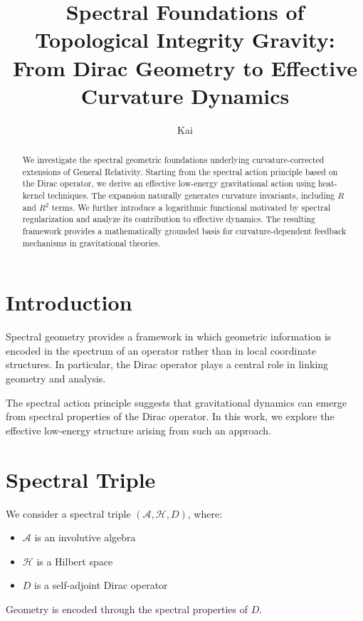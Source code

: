 \documentclass[11pt]{article}
\title{Spectral Foundations of Topological Integrity Gravity:\\
From Dirac Geometry to Effective Curvature Dynamics}
\author{Kai}
\date{}
\begin{document}
\maketitle

\begin{abstract}
We investigate the spectral geometric foundations underlying curvature-corrected extensions of General Relativity. Starting from the spectral action principle based on the Dirac operator, we derive an effective low-energy gravitational action using heat-kernel techniques. The expansion naturally generates curvature invariants, including $R$ and $R^2$ terms. We further introduce a logarithmic functional motivated by spectral regularization and analyze its contribution to effective dynamics. The resulting framework provides a mathematically grounded basis for curvature-dependent feedback mechanisms in gravitational theories.
\end{abstract}

\section{Introduction}

Spectral geometry provides a framework in which geometric information is encoded in the spectrum of an operator rather than in local coordinate structures. In particular, the Dirac operator plays a central role in linking geometry and analysis.

The spectral action principle suggests that gravitational dynamics can emerge from spectral properties of the Dirac operator. In this work, we explore the effective low-energy structure arising from such an approach.

\section{Spectral Triple}

We consider a spectral triple $(\mathcal{A}, \mathcal{H}, D)$, where:

\begin{itemize}
\item $\mathcal{A}$ is an involutive algebra
\item $\mathcal{H}$ is a Hilbert space
\item $D$ is a self-adjoint Dirac operator
\end{itemize}

Geometry is encoded through the spectral properties of $D$.
\end{document}
